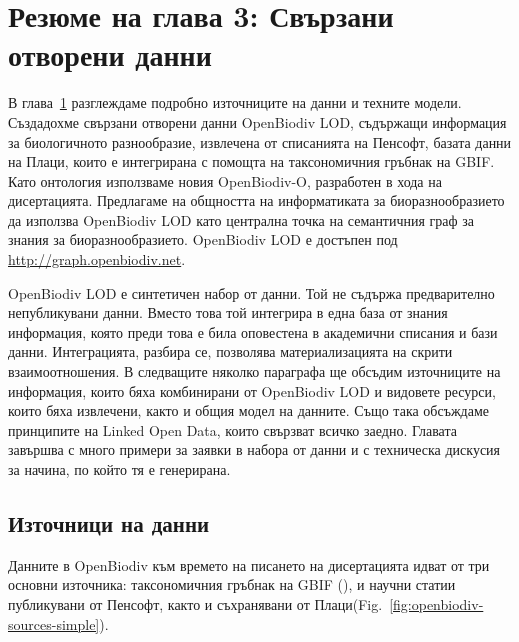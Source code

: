 \chapter{Резюме на глава 3: Свързани отворени данни}
\label{chapter-lod}

В глава~\ref{chapter-lod} разглеждаме подробно източниците на данни и техните модели. Създадохме свързани отворени данни OpenBiodiv LOD, съдържащи информация за биологичното разнообразие, извлечена от списанията на Пенсофт, базата данни на Плаци, които е интегрирана с помощта на таксономичния гръбнак на GBIF. Като онтология използваме новия \mbox{OpenBiodiv-O}, разработен в хода на дисертацията. Предлагаме на общността на информатиката за биоразнообразието да използва OpenBiodiv LOD като централна точка на семантичния граф за знания за биоразнообразието. OpenBiodiv LOD е достъпен под \url{http://graph.openbiodiv.net}.

OpenBiodiv LOD е синтетичен набор от данни. Той не съдържа предварително непубликувани данни. Вместо това той интегрира в една база от знания информация, която преди това е била оповестена в академични списания и бази данни. Интеграцията, разбира се, позволява материализацията на скрити взаимоотношения. В следващите няколко параграфа ще обсъдим източниците на информация, които бяха комбинирани от OpenBiodiv LOD и видовете ресурси, които бяха извлечени, както и общия модел на данните. Също така обсъждаме принципите на Linked Open Data, които свързват всичко заедно. Главата завършва с много примери за заявки в набора от данни и с техническа дискусия за начина, по който тя е генерирана.

\section{Източници на данни}

Данните в OpenBiodiv към времето на писането на дисертацията идват от три основни източника: таксономичния гръбнак на GBIF (\cite{gbif_secretariat_gbif_2017}), и научни статии публикувани от Пенсофт, както и съхранявани от Плаци(Fig.~\ref{fig:openbiodiv-sources-simple}).

